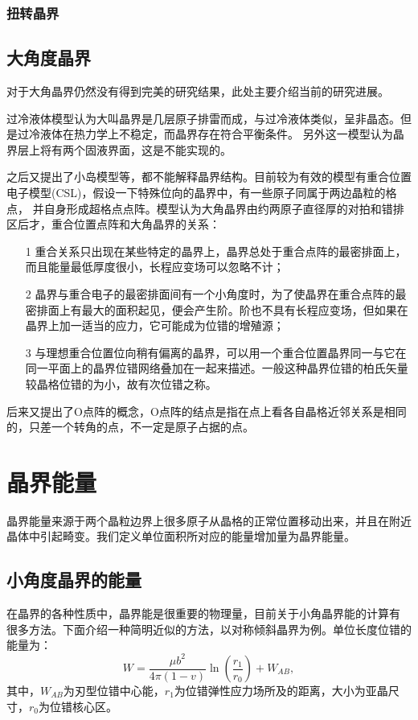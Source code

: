             \subsubsection{扭转晶界}
        \subsection{大角度晶界}
            对于大角晶界仍然没有得到完美的研究结果，此处主要介绍当前的研究进展。

            过冷液体模型认为大叫晶界是几层原子排雷而成，与过冷液体类似，呈非晶态。但是过冷液体在热力学上不稳定，而晶界存在符合平衡条件。
            另外这一模型认为晶界层上将有两个固液界面，这是不能实现的。

            之后又提出了小岛模型等，都不能解释晶界结构。目前较为有效的模型有重合位置电子模型(CSL)，假设一下特殊位向的晶界中，有一些原子同属于两边晶粒的格点，
            并自身形成超格点点阵。模型认为大角晶界由约两原子直径厚的对拍和错排区后才，重合位置点阵和大角晶界的关系：
            \begin{itemize}
                \item[1] 重合关系只出现在某些特定的晶界上，晶界总处于重合点阵的最密排面上，而且能量最低厚度很小，长程应变场可以忽略不计；
                \item[2] 晶界与重合电子的最密排面间有一个小角度时，为了使晶界在重合点阵的最密排面上有最大的面积起见，便会产生阶。阶也不具有长程应变场，但如果在晶界上加一适当的应力，它可能成为位错的增殖源；
                \item[3] 与理想重合位置位向稍有偏离的晶界，可以用一个重合位置晶界同一与它在同一平面上的晶界位错网络叠加在一起来描述。一般这种晶界位错的柏氏矢量较晶格位错的为小，故有次位错之称。
            \end{itemize}

            后来又提出了O点阵的概念，O点阵的结点是指在点上看各自晶格近邻关系是相同的，只差一个转角的点，不一定是原子占据的点。
    \section{晶界能量}
        晶界能量来源于两个晶粒边界上很多原子从晶格的正常位置移动出来，并且在附近晶体中引起畸变。我们定义单位面积所对应的能量增加量为晶界能量。
        \subsection{小角度晶界的能量}
            在晶界的各种性质中，晶界能是很重要的物理量，目前关于小角晶界能的计算有
            很多方法。下面介绍一种简明近似的方法，以对称倾斜晶界为例。单位长度位错的能量为：
            \begin{equation}
                W=\frac{\mu b^{2}}{4 \pi(1-v)} \ln \left(\frac{r_{1}}{r_{0}}\right)+W_{A B},
            \end{equation}
            其中，$W_{AB}$为刃型位错中心能，$r_1$为位错弹性应力场所及的距离，大小为亚晶尺寸，$r_0$为位错核心区。

